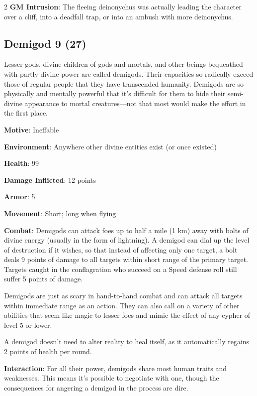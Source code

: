 \begin{multicols}{2}
\textbf{GM Intrusion}: The fleeing deinonychus was actually leading the character over a cliff, into a deadfall trap, or into an ambush with more deinonychus.

\subsection{Demigod	9 (27)}

Lesser gods, divine children of gods and mortals, and other beings bequeathed with partly divine power are called demigods. Their capacities so radically exceed those of regular people that they have transcended humanity. Demigods are so physically and mentally powerful that it’s difficult for them to hide their semi-divine appearance to mortal creatures—not that most would make the effort in the first place.

\textbf{Motive}: Ineffable

\textbf{Environment}: Anywhere other divine entities exist (or once existed)

\textbf{Health}: 99

\textbf{Damage Inflicted}: 12 points

\textbf{Armor}: 5

\textbf{Movement}: Short; long when flying

\textbf{Combat}: Demigods can attack foes up to half a mile (1 km) away with bolts of divine energy (usually in the form of lightning). A demigod can dial up the level of destruction if it wishes, so that instead of affecting only one target, a bolt deals 9 points of damage to all targets within short range of the primary target. Targets caught in the conflagration who succeed on a Speed defense roll still suffer 5 points of damage.

Demigods are just as scary in hand-to-hand combat and can attack all targets within immediate range as an action. They can also call on a variety of other abilities that seem like magic to lesser foes and mimic the effect of any cypher of level 5 or lower.

A demigod doesn’t need to alter reality to heal itself, as it automatically regains 2 points of health per round.

\textbf{Interaction}: For all their power, demigods share most human traits and weaknesses. This means it’s possible to negotiate with one, though the consequences for angering a demigod in the process are dire.


\end{multicols}
